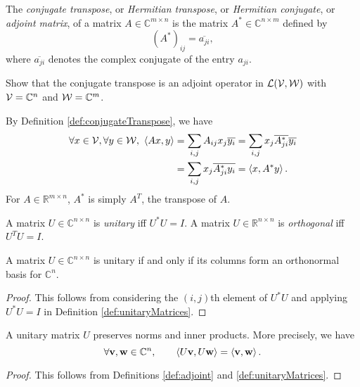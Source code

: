 \begin{defn}
  \label{def:conjugateTranspose}
  The \emph{conjugate transpose}, or
  \emph{Hermitian transpose}, or
  \emph{Hermitian conjugate}, or \emph{adjoint matrix}, 
  of a matrix $A\in \mathbb{C}^{m\times n}$
  is the matrix $A^*\in \mathbb{C}^{n\times m}$ defined by
  \begin{equation}
    \label{eq:conjugateTranspose}
    (A^*)_{ij}=\overline{a_{ji}},
  \end{equation}
  where $\overline{a_{ji}}$ denotes
  the complex conjugate of the entry $a_{ji}$.%
\end{defn}

\begin{exc}
  \label{exc:adjointAndConjugateTranspose}
  Show that 
  the conjugate transpose is an adjoint operator
  in ${\cal L}({\cal V},{\cal W})$
  with ${\cal V}=\mathbb{C}^n$ and ${\cal W}=\mathbb{C}^m$.
\end{exc}
\begin{solution}
  By Definition \ref{def:conjugateTranspose}, we have
  \begin{align*}
    \forall x\in {\cal V}, \forall y\in {\cal W},\ 
    \innerProd{Ax,y} &= \sum_{i,j} A_{ij}x_j\ccg{y_i}
                 = \sum_{i,j} x_j\ccg{A^*_{ji}}\ccg{y_i}
    \\
               &= \sum_{i,j} x_j\ccg{A^*_{ji}y_i}
                 = \innerProd{x, A^* y}.
  \end{align*}
  For $A\in \mathbb{R}^{m\times n}$,
  $A^*$ is simply $A^T$, the transpose of $A$.
\end{solution}

\begin{defn}
  \label{def:unitaryMatrices}
  A matrix $U\in \mathbb{C}^{n\times n}$ is \emph{unitary}
  iff $U^*U=I$.
  A matrix $U\in \mathbb{R}^{n\times n}$ is \emph{orthogonal}
  iff $U^TU=I$.
\end{defn}

\begin{thm}
  \label{thm:unitaryMatrixHasOrthonormalColumns}
  A matrix $U\in \mathbb{C}^{n\times n}$ is unitary
  if and only if its columns form an orthonormal basis
  for $\mathbb{C}^n$.
\end{thm}
\begin{proof}
  This follows from
  considering the $(i,j)$th element of $U^*U$
  and applying $U^*U=I$
  in Definition \ref{def:unitaryMatrices}.
\end{proof}

\begin{coro}
  \label{coro:unitaryMatricesPreserveNorms}
  A unitary matrix $U$ preserves norms and inner products.
  More precisely, we have 
  \begin{displaymath}
    \forall \mathbf{v}, \mathbf{w}\in \mathbb{C}^n,\qquad
    \left\langle U\mathbf{v}, U\mathbf{w} \right\rangle = \left\langle \mathbf{v}, \mathbf{w} \right\rangle.
  \end{displaymath}
\end{coro}
\begin{proof}
  This follows from Definitions \ref{def:adjoint}
  and \ref{def:unitaryMatrices}.
\end{proof}

